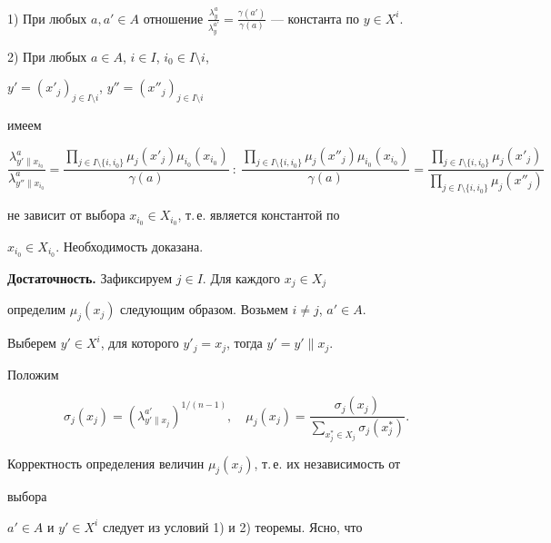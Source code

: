 \begin{pf}
 


1) При любых $a,a'\in A$ отношение $\frac{\lambda^a_y}{\lambda^{a'}_y}= 


\frac{\gamma(a')}{\gamma(a)}$ --- константа по $y\in X^i$. 


 


2) При любых $a\in A$, $i\in I$, $i_0\in I\setminus i$, 


$y'=(x'_j)_{j\in I\setminus i}$, $y''=(x''_j)_{j\in I\setminus i}$ 


имеем 


$$ 


\frac{\lambda^a_{y'\|x_{i_0}}}{\lambda^a_{y''\|x_{i_0}}}= 


\frac{\prod\limits_{j\in I\setminus\{i,i_0\}}\mu_j(x'_j) 


\mu_{i_0}(x_{i_0})}{\gamma(a)}\ :\ 


\frac{\prod\limits_{j\in I\setminus\{i,i_0\}}\mu_j(x''_j) 


\mu_{i_0}(x_{i_0})}{\gamma(a)}= 


\frac{\prod\limits_{j\in I\setminus\{i,i_0\}}\mu_j(x'_j)} 


{\prod\limits_{j\in I\setminus\{i,i_0\}}\mu_j(x''_j)} 


$$ 


не зависит от выбора $x_{i_0}\in X_{i_0}$, т.\,е. является константой по 


$x_{i_0}\in X_{i_0}$. Необходимость доказана. 


\medskip 


 


{\bf Достаточность.} Зафиксируем $j\in I$. Для каждого $x_j\in X_j$ 


определим $\mu_j(x_j)$ следующим образом. Возьмем $i\ne j$, $a'\in A$. 


Выберем $y'\in X^i$, для которого $y'_j=x_j$, тогда $y'=y'\|x_j$. 


Положим 


$$ 


\sigma_j(x_j)=(\lambda^{a'}_{y'\|x_j})^{1/(n-1)},\quad 


\mu_j(x_j)=\frac{\sigma_j(x_j)} 


{\sum\limits_{x^*_j\in X_j}\sigma_j(x^*_j)}. 


$$ 


Корректность определения величин $\mu_j(x_j)$, т.\,е. их независимость от 


выбора 


$a'\in A$ и $y'\in X^i$ следует из условий 1) и 2) теоремы. Ясно, что 



\end{pf}
